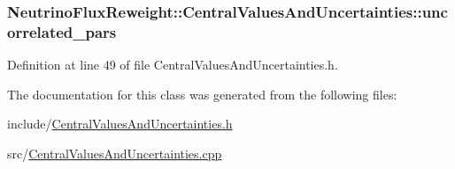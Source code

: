 \hypertarget{class_neutrino_flux_reweight_1_1_central_values_and_uncertainties_a63acf76ede3ceff854b857a85612144b}{
\subsubsection[{uncorrelated\-\_\-pars}]{ Neutrino\-Flux\-Reweight\-::\-Central\-Values\-And\-Uncertainties\-::uncorrelated\-\_\-pars\hspace{0.3cm}{\ttfamily [private]}}}\label{class_neutrino_flux_reweight_1_1_central_values_and_uncertainties_a63acf76ede3ceff854b857a85612144b}


Definition at line 49 of file Central\-Values\-And\-Uncertainties.\-h.



The documentation for this class was generated from the following files\-:\begin{DoxyCompactItemize}
\item 
include/\hyperlink{_central_values_and_uncertainties_8h}{Central\-Values\-And\-Uncertainties.\-h}\item 
src/\hyperlink{_central_values_and_uncertainties_8cpp}{Central\-Values\-And\-Uncertainties.\-cpp}\end{DoxyCompactItemize}
